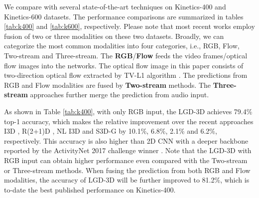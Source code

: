 \documentclass[10pt,twocolumn,letterpaper]{article}
\begin{document}
We compare with several state-of-the-art techniques on Kinetics-400 and Kinetics-600 datasets. The performance comparisons are summarized in tables \ref{tab:k400} and \ref{tab:k600}, respectively. Please note that most recent works employ fusion of two or three modalities on these two datasets. Broadly, we can categorize the most common modalities into four categories, i.e., RGB, Flow, Two-stream and Three-stream. The \textbf{RGB}/\textbf{Flow} feeds the video frames/optical flow images into the networks. The optical flow image in this paper consists of two-direction optical flow extracted by TV-L1 algorithm \cite{zach2007duality}. The predictions from RGB and Flow modalities are fused by \textbf{Two-stream} methods. The \textbf{Three-stream} approaches further merge the prediction from audio input.

As shown in Table \ref{tab:k400}, with only RGB input, the LGD-3D achieves 79.4\% top-1 accuracy, which makes the relative improvement over the recent approaches I3D \cite{carreira2017quo}, R(2+1)D \cite{tran2018closer}, NL I3D \cite{wang2018non} and S3D-G \cite{xie2018rethinking} by 10.1\%, 6.8\%, 2.1\% and 6.2\%, respectively. This accuracy is also higher than 2D CNN with a deeper backbone reported by the ActivityNet 2017 challenge winner \cite{bian2017revisiting}. Note that the LGD-3D with RGB input can obtain higher performance even compared with the Two-stream or Three-stream methods. When fusing the prediction from both RGB and Flow modalities, the accuracy of LGD-3D will be further improved to 81.2\%, which is to-date the best published performance on Kinetics-400.
\end{document}
